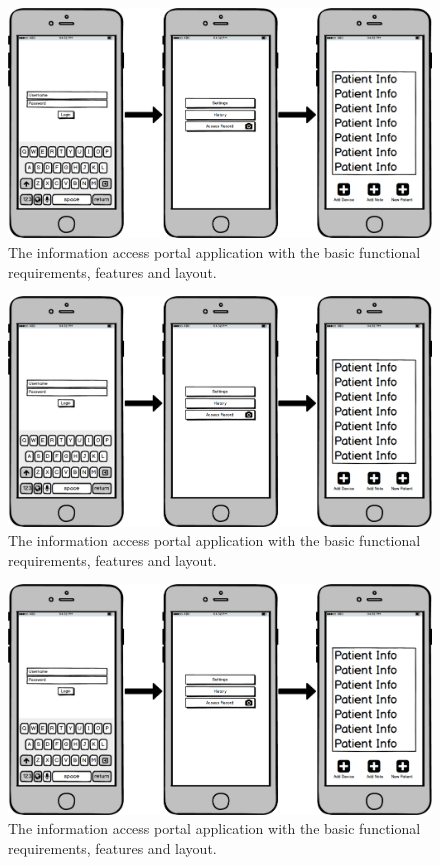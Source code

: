 \begin{figure}[h]
  \centering
  \includegraphics[width=\linewidth]{wireframe.png}
  \captionsetup{format=hang}
  \caption[App Login Screen]{The information access portal application with the basic functional requirements, features and layout.}
  \label{fig:app1}
\end{figure}
\begin{figure}[h]
  \centering
  \includegraphics[width=\linewidth]{wireframe.png}
  \captionsetup{format=hang}
  \caption[App Home Screen]{The information access portal application with the basic functional requirements, features and layout.}
  \label{fig:app2}
\end{figure}
\begin{figure}[h]
  \centering
  \includegraphics[width=\linewidth]{wireframe.png}
  \captionsetup{format=hang}
  \caption[App Patient Screen]{The information access portal application with the basic functional requirements, features and layout.}
  \label{fig:app3}
\end{figure}

